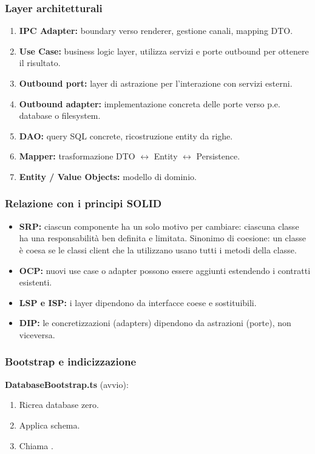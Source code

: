 \subsubsection{Layer architetturali}
\begin{enumerate}
    \item \textbf{IPC Adapter:} boundary verso renderer, gestione canali, mapping DTO.
    \item \textbf{Use Case:} business logic layer, utilizza servizi e porte outbound per ottenere il risultato.
    \item \textbf{Outbound port:} layer di astrazione per l'interazione con servizi esterni.
    \item \textbf{Outbound adapter:} implementazione concreta delle porte verso p.e. database o filesystem.
    \item \textbf{DAO:} query SQL concrete, ricostruzione entity da righe.
    \item \textbf{Mapper:} trasformazione DTO $\leftrightarrow$ Entity $\leftrightarrow$ Persistence.
    \item \textbf{Entity / Value Objects:} modello di dominio.
\end{enumerate}

\subsubsection{Relazione con i principi SOLID}
\begin{itemize}
    \item \textbf{SRP:} ciascun componente ha un solo motivo per cambiare: ciascuna classe ha una responsabilità ben definita e limitata. Sinonimo di coesione: un classe è coesa se le classi client che la utilizzano usano tutti i metodi della classe.
    \item \textbf{OCP:} nuovi use case o adapter possono essere aggiunti estendendo i contratti esistenti.
    \item \textbf{LSP e ISP:} i layer dipendono da interfacce coese e sostituibili.
    \item \textbf{DIP:} le concretizzazioni (adapters) dipendono da astrazioni (porte), non viceversa.
\end{itemize}

\subsubsection{Bootstrap e indicizzazione}
\noindent
\textbf{DatabaseBootstrap.ts} (avvio):
\begin{enumerate}[labelwidth=0.8cm,leftmargin=1cm]
    \item Ricrea database zero.
    \item Applica schema.
    \item Chiama .
\end{enumerate}

